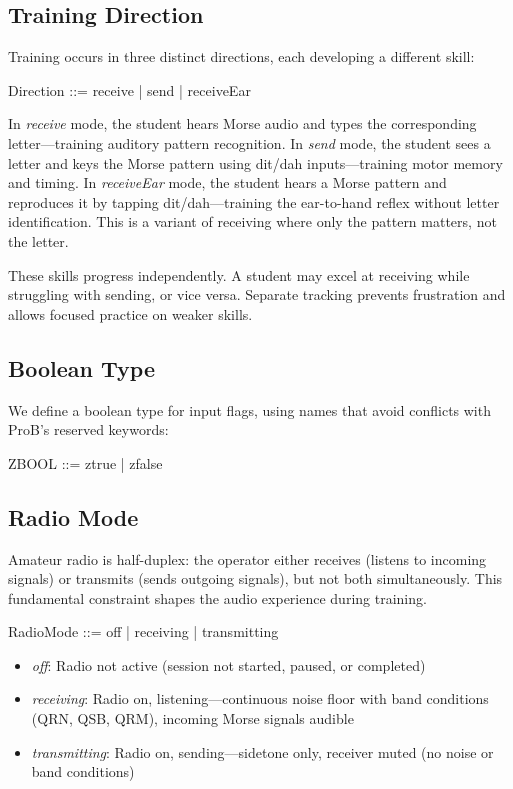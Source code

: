 \documentclass[a4paper,10pt,fleqn]{article}
\begin{document}
\subsection{Training Direction}

Training occurs in three distinct directions, each developing a different skill:

\begin{zed}
Direction ::= receive | send | receiveEar
\end{zed}

In \emph{receive} mode, the student hears Morse audio and types the corresponding
letter---training auditory pattern recognition. In \emph{send} mode, the student
sees a letter and keys the Morse pattern using dit/dah inputs---training motor
memory and timing. In \emph{receiveEar} mode, the student hears a Morse pattern
and reproduces it by tapping dit/dah---training the ear-to-hand reflex without
letter identification. This is a variant of receiving where only the pattern
matters, not the letter.

These skills progress independently. A student may excel at receiving while
struggling with sending, or vice versa. Separate tracking prevents frustration
and allows focused practice on weaker skills.

\subsection{Boolean Type}

We define a boolean type for input flags, using names that avoid conflicts
with ProB's reserved keywords:

\begin{zed}
ZBOOL ::= ztrue | zfalse
\end{zed}

\subsection{Radio Mode}

Amateur radio is half-duplex: the operator either receives (listens to incoming
signals) or transmits (sends outgoing signals), but not both simultaneously.
This fundamental constraint shapes the audio experience during training.

\begin{zed}
RadioMode ::= off | receiving | transmitting
\end{zed}

\begin{itemize}
\item \emph{off}: Radio not active (session not started, paused, or completed)
\item \emph{receiving}: Radio on, listening---continuous noise floor with
      band conditions (QRN, QSB, QRM), incoming Morse signals audible
\item \emph{transmitting}: Radio on, sending---sidetone only, receiver muted
      (no noise or band conditions)
\end{itemize}
\end{document}
